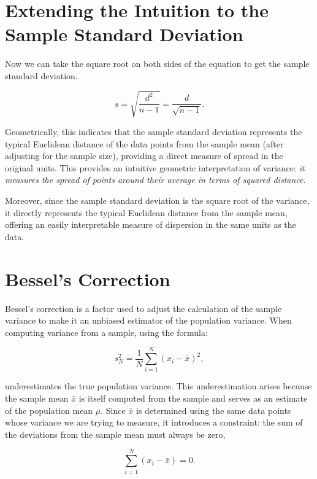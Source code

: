 \documentclass{article}
\begin{document}
\section{Extending the Intuition to the Sample Standard Deviation}

Now we can take the square root on both sides of the equation to get the sample standard deviation.

\begin{equation}
    s = \sqrt{\frac{d^2}{n-1}} = \frac{d}{\sqrt{n-1}}  .
\end{equation}

Geometrically, this indicates that the sample standard deviation represents the typical Euclidean distance of the data points from the sample mean (after adjusting for the sample size), providing a direct measure of spread in the original units. This provides an intuitive geometric interpretation of variance: \emph{it measures the spread of points around their average in terms of squared distance}. 

Moreover, since the sample standard deviation is the square root of the variance, it directly represents the typical Euclidean distance from the sample mean, offering an easily interpretable measure of dispersion in the same units as the data.


\section*{Bessel's Correction}


Bessel's correction is a factor used to adjust the calculation of the sample variance to make it an unbiased estimator of the population variance. When computing variance from a sample, using the formula:

\begin{equation}
    s_N^2 = \frac{1}{N} \sum_{i=1}^{N} (x_i - \bar{x})^2,
\end{equation}

underestimates the true population variance. This underestimation arises because the sample mean \( \bar{x} \) is itself computed from the sample and serves as an estimate of the population mean \( \mu \). Since \( \bar{x} \) is determined using the same data points whose variance we are trying to measure, it introduces a constraint: the sum of the deviations from the sample mean must always be zero,

\begin{equation}
    \sum_{i=1}^{N} (x_i - \bar{x}) = 0.
\end{equation}
\end{document}
